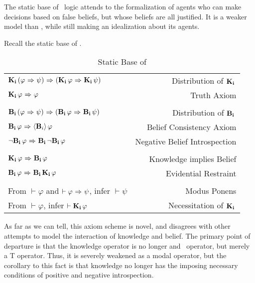 The static base of \DASL\ logic attends to the formalization of agents who can make decisions based on false beliefs, but whose beliefs are all justified. It is a weaker model than \SFive, while still making an idealization about its agents.

Recall the static base of \DASL.

\begin{table}[H]
	\begin{center}
		\begin{tabular}{| l r |}
			\hline
			$\mathbf{K}_{\mathbf{i}}\,(\varphi {\ \Rightarrow \ } \psi) {\ \Rightarrow \ } (\mathbf{K}_{\mathbf{i}}\,\varphi {\ \Rightarrow \ } \mathbf{K}_{\mathbf{i}}\,\psi)$ & Distribution of $\mathbf{K}_{\mathbf{i}}\,$ \\
			$\mathbf{K}_{\mathbf{i}}\,\varphi {\ \Rightarrow \ } \varphi$ & Truth Axiom \\
			&\\
			$\mathbf{B}_{\mathbf{i}}\,(\varphi {\ \Rightarrow \ } \psi) {\ \Rightarrow \ } (\mathbf{B}_{\mathbf{i}}\,\varphi {\ \Rightarrow \ } \mathbf{B}_{\mathbf{i}}\,\psi)$ & Distribution of $\mathbf{B}_{\mathbf{i}}\,$\\
			$\mathbf{B}_{\mathbf{i}}\,\varphi {\ \Rightarrow \ } \langle \mathbf{B}_{i} \rangle\,\varphi$ & Belief Consistency Axiom\\
			${\neg}\mathbf{B}_{\mathbf{i}}\,\varphi {\ \Rightarrow \ } \mathbf{B}_{\mathbf{i}}\,{\neg}\mathbf{B}_{\mathbf{i}}\,\varphi$ & Negative Belief Introspection\\
			&\\
			$\mathbf{K}_{\mathbf{i}}\,\varphi {\ \Rightarrow \ } \mathbf{B}_{\mathbf{i}}\,\varphi$ & Knowledge implies Belief \\
			$\mathbf{B}_{\mathbf{i}}\,\varphi {\ \Rightarrow \ } \mathbf{B}_{\mathbf{i}}\,\mathbf{K}_{\mathbf{i}}\,\varphi$ & Evidential Restraint\\
			&\\
			From $\vdash \varphi$ and $\vdash \varphi {\ \Rightarrow \ } \psi$, infer $\vdash\psi$ & Modus Ponens\\
			From $\vdash \varphi$, infer $\vdash \mathbf{K}_{\mathbf{i}}\,\varphi$ & Necessitation of $\mathbf{K}_{\mathbf{i}}\,$\\
			\hline
		\end{tabular}
		\caption{Static Base of \DASL}
	\end{center}
\end{table}

As far as we can tell, this axiom scheme is novel, and disagrees with other attempts to model the interaction of knowledge and belief. The primary point of departure is that the knowledge operator is no longer and \SFive\ operator, but merely a T operator. Thus, it is severely weakened as a modal operator, but the corollary to this fact is that knowledge no longer has the imposing necessary conditions of positive and negative introspection. 

